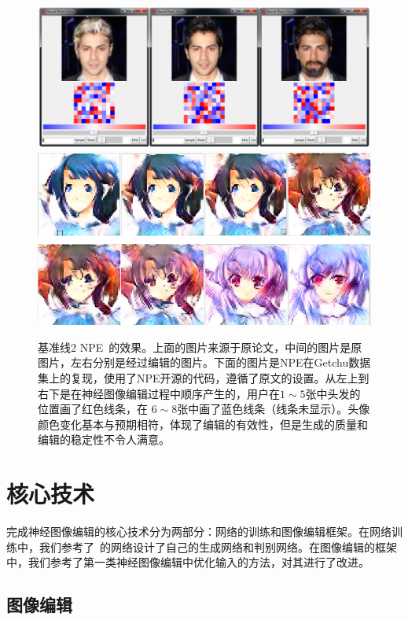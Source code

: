 \documentclass[a4paper,12pt,UTF8]{ctexart}
\newcommand{\kai}{\CJKfamily{zhkai}}	%
\begin{document}
\begin{figure}[H]
  \centering
  \includegraphics[width=0.7\linewidth]{figs/baseline_face.PNG}
  \includegraphics[width=0.9\linewidth]{figs/baseline2.PNG}
  \caption{\kai 基准线2 NPE~\cite{Brock2016Neural}的效果。上面的图片来源于原论文，中间的图片是原图片，左右分别是经过编辑的图片。下面的图片是NPE在Getchu数据集上的复现，使用了NPE开源的代码，遵循了原文的设置。从左上到右下是在神经图像编辑过程中顺序产生的，用户在$1\sim5$张中头发的位置画了红色线条，在 $6\sim8$张中画了蓝色线条（线条未显示）。头像颜色变化基本与预期相符，体现了编辑的有效性，但是生成的质量和编辑的稳定性不令人满意。}
  \label{fig:baseline2}
\end{figure}

\section{核心技术}

完成神经图像编辑的核心技术分为两部分：网络的训练和图像编辑框架。在网络训练中，我们参考了~\cite{Jin2017Towards}的网络设计了自己的生成网络和判别网络。在图像编辑的框架中，我们参考了第一类神经图像编辑中优化输入的方法，对其进行了改进。

\subsection{图像编辑}
\end{document}
